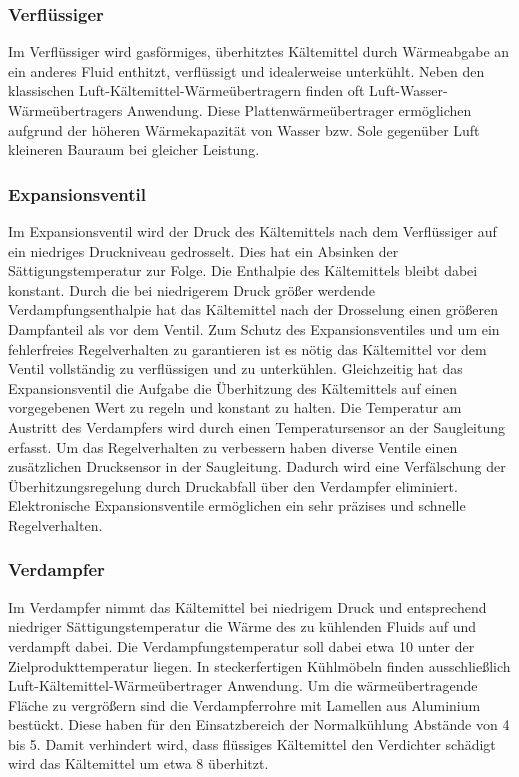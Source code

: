 \subsubsection{Verflüssiger}
\label{subsubsec:Verflüssiger}

Im Verflüssiger wird gasförmiges, überhitztes Kältemittel durch Wärmeabgabe an ein anderes Fluid enthitzt, verflüssigt und idealerweise unterkühlt. Neben den klassischen Luft-Kältemittel-Wärmeübertragern finden oft Luft-Wasser-Wärmeübertragers Anwendung. Diese Plattenwärmeübertrager ermöglichen aufgrund der höheren Wärmekapazität von Wasser bzw. Sole gegenüber Luft kleineren Bauraum bei gleicher Leistung.

\subsubsection{Expansionsventil}
\label{subsubsec:Expansionsventil}


Im Expansionsventil wird der Druck des Kältemittels nach dem Verflüssiger auf ein niedriges Druckniveau gedrosselt. Dies hat ein Absinken der Sättigungstemperatur zur Folge. Die Enthalpie des Kältemittels bleibt dabei konstant. Durch die bei niedrigerem Druck größer werdende Verdampfungsenthalpie hat das Kältemittel nach der Drosselung einen größeren Dampfanteil als vor dem Ventil. Zum Schutz des Expansionsventiles und um ein fehlerfreies Regelverhalten zu garantieren ist es nötig das Kältemittel vor dem Ventil vollständig zu verflüssigen und zu unterkühlen. Gleichzeitig hat das Expansionsventil die Aufgabe die Überhitzung des Kältemittels auf einen vorgegebenen Wert zu regeln und konstant zu halten. Die Temperatur am Austritt des Verdampfers wird durch einen Temperatursensor an der Saugleitung erfasst. Um das Regelverhalten zu verbessern haben diverse Ventile einen zusätzlichen Drucksensor in der Saugleitung. Dadurch wird eine Verfälschung der Überhitzungsregelung durch Druckabfall über den Verdampfer eliminiert. Elektronische Expansionsventile ermöglichen ein sehr präzises und schnelle Regelverhalten. 

\subsubsection{Verdampfer}
\label{subsubsec:Verdampfer}

Im Verdampfer nimmt das Kältemittel bei niedrigem Druck und entsprechend niedriger Sättigungstemperatur die Wärme des zu kühlenden Fluids auf und verdampft dabei. Die Verdampfungstemperatur soll dabei etwa \unit{10}{\kelvin} unter der Zielprodukttemperatur liegen. In steckerfertigen Kühlmöbeln finden ausschließlich Luft-Kältemittel-Wärmeübertrager Anwendung. Um die wärmeübertragende Fläche zu vergrößern sind die Verdampferrohre mit Lamellen aus Aluminium bestückt. Diese haben für den Einsatzbereich der Normalkühlung Abstände von \unit{4}{\milli\metre} bis \unit{5}{\milli\metre}. Damit verhindert wird, dass flüssiges Kältemittel den Verdichter schädigt wird das Kältemittel um etwa \unit{8}{\kelvin} überhitzt.





